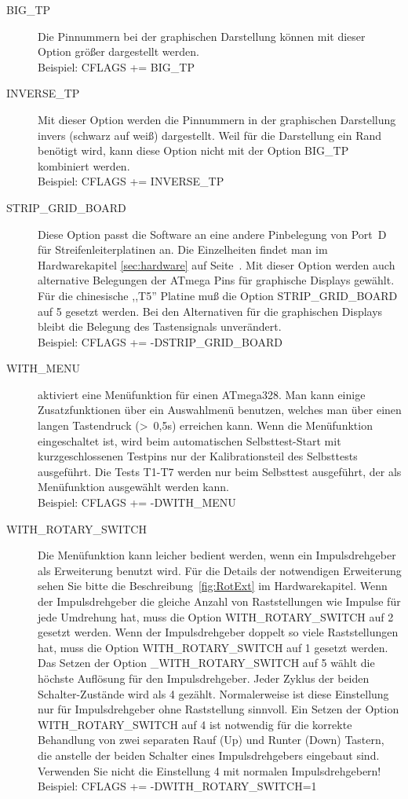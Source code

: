 \begin{description}
 \item[BIG\_TP] Die Pinnummern bei der graphischen Darstellung können mit dieser Option größer dargestellt werden.\\
Beispiel: CFLAGS += BIG\_TP

 \item[INVERSE\_TP] Mit dieser Option werden die Pinnummern in der graphischen Darstellung invers (schwarz auf weiß) dargestellt.
Weil für die Darstellung ein Rand benötigt wird, kann diese Option nicht mit der Option BIG\_TP kombiniert werden.\\
Beispiel: CFLAGS += INVERSE\_TP

  \item[STRIP\_GRID\_BOARD] Diese Option passt die Software an eine andere Pinbelegung von Port~D für Streifenleiterplatinen an.
Die Einzelheiten findet man im Hardwarekapitel \ref{sec:hardware} auf Seite~\pageref{sec:hardware}.
Mit dieser Option werden auch alternative Belegungen der ATmega Pins für graphische Displays gewählt.
Für die chinesische ,,T5'' Platine muß die Option STRIP\_GRID\_BOARD auf 5 gesetzt werden.
Bei den Alternativen für die graphischen Displays bleibt die Belegung  des Tastensignals unverändert.\\
Beispiel: CFLAGS += -DSTRIP\_GRID\_BOARD

  \item[WITH\_MENU] aktiviert eine Menüfunktion für einen ATmega328. Man kann einige Zusatzfunktionen über ein
Auswahlmenü benutzen, welches man über einen langen Tastendruck (\textgreater~0,5s) erreichen kann.
Wenn die Menüfunktion eingeschaltet ist, wird beim automatischen Selbsttest-Start mit kurzgeschlossenen Testpins
 nur der Kalibrationsteil des Selbsttests ausgeführt.
Die Tests T1-T7 werden nur beim Selbsttest ausgeführt, der als Menüfunktion ausgewählt werden kann.\\
Beispiel: CFLAGS += -DWITH\_MENU

  \item[WITH\_ROTARY\_SWITCH] Die Menüfunktion kann leicher bedient werden, wenn ein Impulsdrehgeber als Erweiterung
benutzt wird.
Für die Details der notwendigen Erweiterung sehen Sie bitte die Beschreibung~\ref{fig:RotExt} im Hardwarekapitel.
Wenn der Impulsdrehgeber die gleiche Anzahl von Raststellungen wie Impulse für jede Umdrehung hat,
muss die Option WITH\_ROTARY\_SWITCH auf 2 gesetzt werden.
Wenn der Impulsdrehgeber doppelt so viele Raststellungen hat, muss die Option WITH\_ROTARY\_SWITCH auf 1 gesetzt werden.
Das Setzen der Option \_WITH\_ROTARY\_SWITCH auf 5 wählt die höchste Auflösung für den Impulsdrehgeber.
Jeder Zyklus der beiden Schalter-Zustände wird als 4 gezählt. Normalerweise ist diese Einstellung nur für
Impulsdrehgeber ohne Raststellung sinnvoll.
Ein Setzen der Option WITH\_ROTARY\_SWITCH auf 4 ist notwendig für die korrekte Behandlung von zwei separaten
Rauf (Up) und Runter (Down) Tastern, die anstelle der beiden Schalter eines Impulsdrehgebers eingebaut sind.
Verwenden Sie nicht die Einstellung 4 mit normalen Impulsdrehgebern!\\
Beispiel: CFLAGS += -DWITH\_ROTARY\_SWITCH=1


\end{description}
